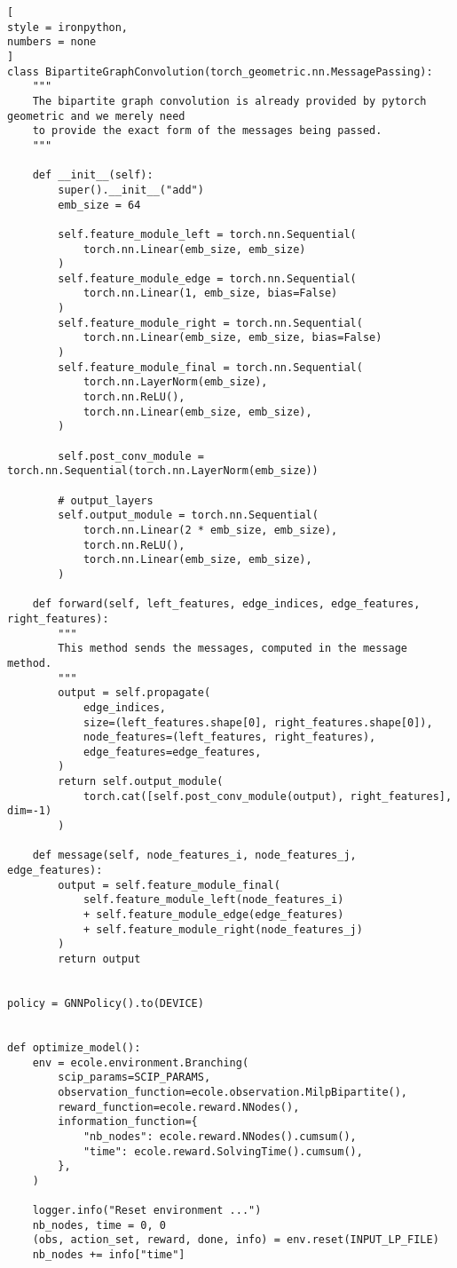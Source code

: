 \documentclass[%
	11pt,
	a4paper,
	utf8,
		]{article}
\begin{document}
\begin{lstlisting}[
style = ironpython,
numbers = none
]
class BipartiteGraphConvolution(torch_geometric.nn.MessagePassing):
	"""
	The bipartite graph convolution is already provided by pytorch geometric and we merely need
	to provide the exact form of the messages being passed.
	"""

	def __init__(self):
		super().__init__("add")
		emb_size = 64

		self.feature_module_left = torch.nn.Sequential(
			torch.nn.Linear(emb_size, emb_size)
		)
		self.feature_module_edge = torch.nn.Sequential(
			torch.nn.Linear(1, emb_size, bias=False)
		)
		self.feature_module_right = torch.nn.Sequential(
			torch.nn.Linear(emb_size, emb_size, bias=False)
		)
		self.feature_module_final = torch.nn.Sequential(
			torch.nn.LayerNorm(emb_size),
			torch.nn.ReLU(),
			torch.nn.Linear(emb_size, emb_size),
		)

		self.post_conv_module = torch.nn.Sequential(torch.nn.LayerNorm(emb_size))

		# output_layers
		self.output_module = torch.nn.Sequential(
			torch.nn.Linear(2 * emb_size, emb_size),
			torch.nn.ReLU(),
			torch.nn.Linear(emb_size, emb_size),
		)

	def forward(self, left_features, edge_indices, edge_features, right_features):
		"""
		This method sends the messages, computed in the message method.
		"""
		output = self.propagate(
			edge_indices,
			size=(left_features.shape[0], right_features.shape[0]),
			node_features=(left_features, right_features),
			edge_features=edge_features,
		)
		return self.output_module(
			torch.cat([self.post_conv_module(output), right_features], dim=-1)
		)

	def message(self, node_features_i, node_features_j, edge_features):
		output = self.feature_module_final(
			self.feature_module_left(node_features_i)
			+ self.feature_module_edge(edge_features)
			+ self.feature_module_right(node_features_j)
		)
		return output


policy = GNNPolicy().to(DEVICE)


def optimize_model():
	env = ecole.environment.Branching(
		scip_params=SCIP_PARAMS,
		observation_function=ecole.observation.MilpBipartite(),
		reward_function=ecole.reward.NNodes(),
		information_function={
			"nb_nodes": ecole.reward.NNodes().cumsum(),
			"time": ecole.reward.SolvingTime().cumsum(),
		},
	)

	logger.info("Reset environment ...")
	nb_nodes, time = 0, 0
	(obs, action_set, reward, done, info) = env.reset(INPUT_LP_FILE)
	nb_nodes += info["time"]


\end{lstlisting}
\end{document}

